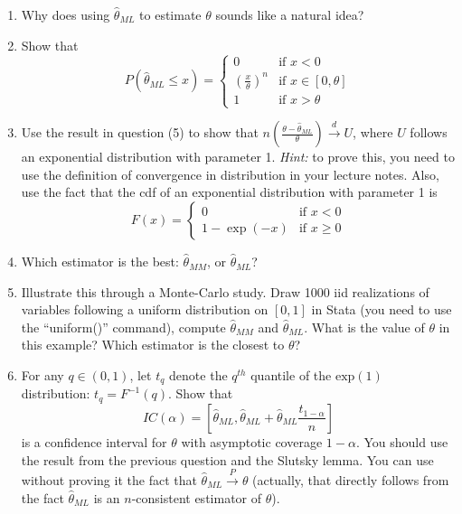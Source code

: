 \documentclass{article}
\begin{document}
\begin{enumerate}[label=(\arabic*), start=4, leftmargin=*, align=left]
    \item Why does using $\hat{\theta}_{ML}$ to estimate $\theta$ sounds like a natural idea?
    \item Show that
    \[
    P(\hat{\theta}_{ML} \leq x) = \left\{
    \begin{array}{ll}
    0 & \text{if } x < 0 \\
    \left( \frac{x}{\theta} \right)^n & \text{if } x \in [0, \theta] \\
    1 & \text{if } x > \theta
    \end{array}
    \right.
    \]
    \item Use the result in question (5) to show that $n\left(\frac{\theta - \hat{\theta}_{ML}}{\theta}\right) \xrightarrow{d} U$, where $U$ follows an exponential distribution with parameter 1. \textit{Hint:} to prove this, you need to use the definition of convergence in distribution in your lecture notes. Also, use the fact that the cdf of an exponential distribution with parameter 1 is
\[
F(x) = \left\{
\begin{array}{ll}
0 & \text{if } x < 0 \\
1 - \exp(-x) & \text{if } x \geq 0
\end{array}
\right.
\]

    \item Which estimator is the best: $\hat{\theta}_{MM}$, or $\hat{\theta}_{ML}$?
    \item Illustrate this through a Monte-Carlo study. Draw 1000 iid realizations of variables following a uniform distribution on $[0,1]$ in Stata (you need to use the ``uniform()'' command), compute $\hat{\theta}_{MM}$ and $\hat{\theta}_{ML}$. What is the value of $\theta$ in this example? Which estimator is the closest to $\theta$?
    \item For any $q \in (0,1)$, let $t_q$ denote the $q^{th}$ quantile of the $\text{exp}(1)$ distribution: $t_q = F^{-1}(q)$. Show that 
    \[
    IC(\alpha) = \left[ \hat{\theta}_{ML}, \hat{\theta}_{ML} + \hat{\theta}_{ML} \frac{t_{1 - \alpha}}{n} \right]
    \]
    is a confidence interval for $\theta$ with asymptotic coverage $1 - \alpha$. You should use the result from the previous question and the Slutsky lemma. You can use without proving it the fact that $\hat{\theta}_{ML} \xrightarrow{P} \theta$ (actually, that directly follows from the fact $\hat{\theta}_{ML}$ is an $n$-consistent estimator of $\theta$).
\end{enumerate}
\end{document}

